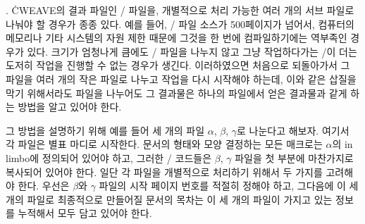 {%
. \.{CWEAVE}의 결과 파일인 \TEX/ 파일을, 개별적으로 처리
가능한 여러 개의 서브 파일로 나눠야 할 경우가 종종 있다. 예를
들어, \TEX/ 파일 소스가 500페이지가 넘어서, 컴퓨터의 메모리나 기타
시스템의 자원 제한 때문에 그것을 한 번에 컴파일하기에는 역부족인 경우가 있다.
크기가 엄청나게 큼에도 \TEX/ 파일을 나누지 않고 그냥
작업하다가는 \TEX/이 더는 도저히 작업을 진행할 수 없는 경우가
생긴다. 이러하였으면 처음으로 되돌아가서 그 파일을 여러 개의 작은
파일로 나누고 작업을 다시 시작해야 하는데, 이와 같은 삽질을 막기
위해서라도 파일을 나누어도 그 결과물은 하나의 파일에서 얻은 결과물과
같게 하는 방법을 알고 있어야 한다.

그 방법을 설명하기 위해 예를 들어 세 개의 파일 $\alpha$, $\beta$,
$\gamma$로 나눈다고 해보자. 여기서 각 파일은 별표 마디로 시작한다.
문서의 형태와 모양 결정하는 모든 매크로는 $\alpha$의 in
limbo에 정의되어 있어야 하고, 그러한 \TEX/ 코드들은 $\beta$,
$\gamma$ 파일을 첫 부분에 마찬가지로 복사되어 있어야 한다.
일단 각 파일을 개별적으로 처리하기 위해서 두 가지를 고려해야 한다. 
우선은 $\beta$와 $\gamma$ 파일의 시작 페이지 번호를 적절히 정해야
하고,  그다음에 이 세 개의 파일로 최종적으로 만들어질 문서의 목차는 이
세 개의 파일이 가지고 있는 정보를 누적해서 모두 담고 있어야 한다.

}
